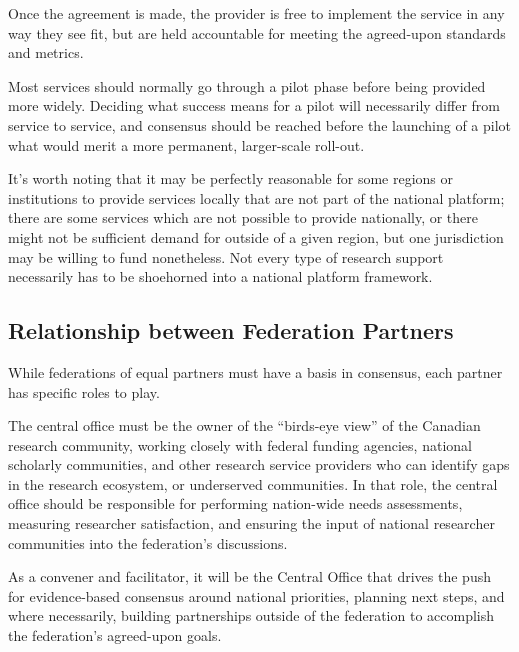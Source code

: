 \documentclass[11pt, letterpaper, twoside]{article}
\begin{document}
Once the agreement is made, the provider is free to implement the
service in any way they see fit, but are held accountable for meeting
the agreed-upon standards and metrics.


Most services should normally go through a pilot phase before being
provided more widely.  Deciding what success means for a pilot will
necessarily differ from service to service, and consensus should be
reached before the launching of a pilot what would merit a more
permanent, larger-scale roll-out.

It's worth noting that it may be perfectly reasonable for some regions
or institutions to provide services locally that are not part of the
national platform; there are some services which are not possible to
provide nationally, or there might not be sufficient demand for outside
of a given region, but one jurisdiction may be willing to fund
nonetheless. Not every type of research support necessarily has to be
shoehorned into a national platform framework.

\subsection*{Relationship between Federation Partners}
%

While federations of equal partners must have a basis in consensus, each
partner has specific roles to play.


The central office must be the owner of the ``birds-eye view'' of the
Canadian research community, working closely with federal funding
agencies, national scholarly communities, and other research service
providers who can identify gaps in the research ecosystem, or
underserved communities.  In that role, the central office should be
responsible for performing nation-wide needs assessments, measuring
researcher satisfaction, and ensuring the input of national researcher
communities into the federation's discussions.


As a convener and facilitator, it will be the Central Office that drives
the push for evidence-based consensus around national priorities,
planning next steps, and where necessarily, building partnerships
outside of the federation to accomplish the federation's agreed-upon
goals.
\end{document}
